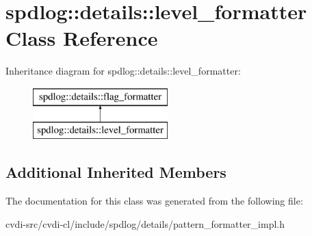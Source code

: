 \hypertarget{classspdlog_1_1details_1_1level__formatter}{}\section{spdlog\+:\+:details\+:\+:level\+\_\+formatter Class Reference}
\label{classspdlog_1_1details_1_1level__formatter}
Inheritance diagram for spdlog\+:\+:details\+:\+:level\+\_\+formatter\+:\begin{figure}[H]
\begin{center}
\leavevmode
\includegraphics[height=2.000000cm]{classspdlog_1_1details_1_1level__formatter}
\end{center}
\end{figure}
\subsection*{Additional Inherited Members}


The documentation for this class was generated from the following file\+:\begin{DoxyCompactItemize}
\item 
cvdi-\/src/cvdi-\/cl/include/spdlog/details/pattern\+\_\+formatter\+\_\+impl.\+h\end{DoxyCompactItemize}
